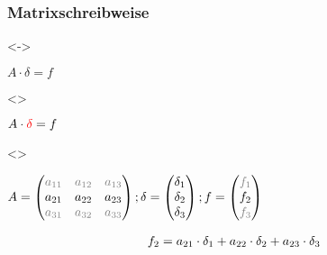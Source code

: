 \documentclass[xcolor=dvipsnames]{beamer}
\newcounter{firstElement}
\newcounter{secondElement}
\newcounter{thirdElement}
\begin{document}
\begin{frame}[t]
  \frametitle{Matrixschreibweise}
  \only<\thefirstElement-\thesecondElement>{
    \centerline{
      $A \cdot \delta = f$}}
  \only<\thethirdElement>{
    \centerline{
      $A \cdot \textcolor{red}{\delta} = f$}}

  \only<\thefirstElement>{
    \vspace{2mm}
    \centerline{
      \begin{math}
        A =
        \begin{pmatrix}
          \textcolor{gray}{a_{11}} & \textcolor{gray}{a_{12}} & \textcolor{gray}{a_{13}} \\
          \textcolor{black}{a_{21}} & \textcolor{black}{a_{22}} & \textcolor{black}{a_{23}} \\
          \textcolor{gray}{a_{31}} & \textcolor{gray}{a_{32}} & \textcolor{gray}{a_{33}} \\
        \end{pmatrix}
        ;
        \delta =
        \begin{pmatrix}
          \textcolor{black}{\delta_1} \\
          \textcolor{black}{\delta_2} \\
          \textcolor{black}{\delta_3} \\
        \end{pmatrix}
        ;
        f =
        \begin{pmatrix}
          \textcolor{gray}{f_1} \\
          \textcolor{black}{f_2} \\
          \textcolor{gray}{f_3} \\
        \end{pmatrix}
      \end{math}}
    \begin{align*}
      \textcolor{black}{f_2} & = \textcolor{black}{a_{21}} \cdot \textcolor{black}{\delta_1} + \textcolor{black}{a_{22}} \cdot \textcolor{black}{\delta_2} + \textcolor{black}{a_{23}} \cdot \textcolor{black}{\delta_3} \\
    \end{align*}}


\end{frame}
\end{document}
